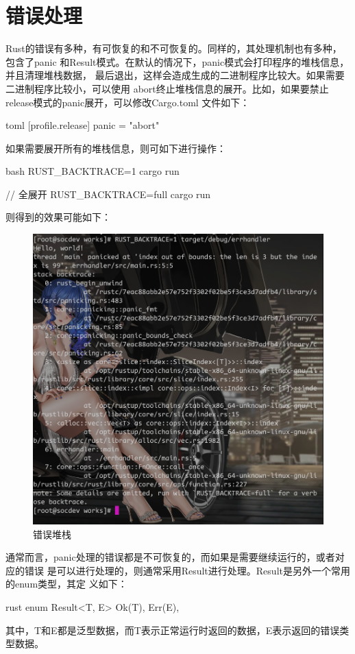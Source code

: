 \section{错误处理}
Rust的错误有多种，有可恢复的和不可恢复的。同样的，其处理机制也有多种，包含了panic
和Result模式。在默认的情况下，panic模式会打印程序的堆栈信息，并且清理堆栈数据，
最后退出，这样会造成生成的二进制程序比较大。如果需要二进制程序比较小，可以使用
abort终止堆栈信息的展开。比如，如果要禁止release模式的panic展开，可以修改Cargo.toml
文件如下：
\begin{code-block}{toml}
[profile.release]
panic = "abort"
\end{code-block}

如果需要展开所有的堆栈信息，则可如下进行操作：
\begin{code-block}{bash}
RUST_BACKTRACE=1 cargo run

// 全展开
RUST_BACKTRACE=full cargo run
\end{code-block}
则得到的效果可能如下：
\begin{figure}[H]
  \centering
  \includegraphics[scale=0.2]{rust_err_panic_trace.png}
  \caption{错误堆栈}
  \label{fig:rust_err_panic_trace}
\end{figure}

通常而言，panic处理的错误都是不可恢复的，而如果是需要继续运行的，或者对应的错误
是可以进行处理的，则通常采用Result进行处理。Result是另外一个常用的enum类型，其定
义如下：
\begin{code-block}{rust}
enum Result<T, E> {
    Ok(T),
    Err(E),
}
\end{code-block}
其中，T和E都是泛型数据，而T表示正常运行时返回的数据，E表示返回的错误类型数据。

